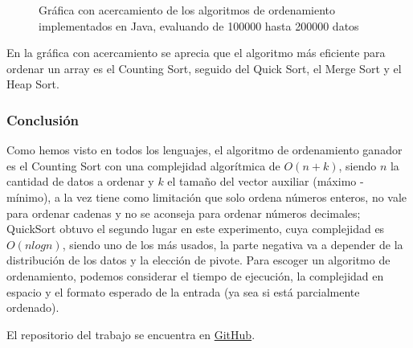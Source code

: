 \begin{itemize}
\begin{figure}[H]
	        \caption{Gráfica con acercamiento de los algoritmos de ordenamiento implementados en Java, evaluando de 100000 hasta 200000 datos}
		\end{figure}
En la gráfica con acercamiento se aprecia que el algoritmo más eficiente para ordenar un array es el Counting Sort, seguido del Quick Sort, el Merge Sort y el Heap Sort.
\end{itemize}

\subsubsection*{Conclusión}
Como hemos visto en todos los lenguajes, el algoritmo de ordenamiento ganador es el Counting Sort con una complejidad algorítmica de $O(n+k)$, siendo $n$ la cantidad de datos a ordenar y $k$ el tamaño del vector auxiliar (máximo - mínimo), a la vez tiene como limitación que solo ordena números enteros, no vale para ordenar cadenas y no se aconseja para ordenar números decimales; QuickSort obtuvo el segundo lugar en este experimento, cuya complejidad es $O(nlogn)$, siendo uno de los más usados, la parte negativa va a depender de la distribución de los datos y la elección de pivote.
Para escoger un algoritmo de ordenamiento, podemos considerar el tiempo de ejecución, la complejidad en espacio y el formato esperado de la entrada (ya sea si está parcialmente ordenado).

El repositorio del trabajo se encuentra en \href{https://github.com/syordya/CSUNSA-EDA}{GitHub}\cite{repo}.

